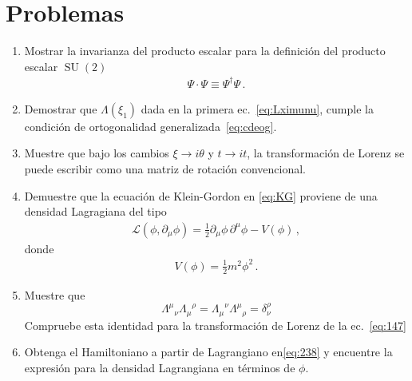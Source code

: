   
 



\section{Problemas}
\label{sec:problemas-2}
\renewcommand{\labelenumi}{\thechapter.\theenumi} %
\begin{enumerate}
\item  Mostrar la invarianza del producto escalar para la definición del producto escalar $\operatorname{SU}(2)$
\begin{align}
   \Psi\cdot \Psi \equiv \Psi^{\dagger}\Psi\,.
\end{align}

\item Demostrar que $\Lambda(\xi_1)$ dada en la primera ec.~\eqref{eq:Lximunu},  cumple la condición de ortogonalidad generalizada~\eqref{eq:cdeog}.

\item Muestre que bajo los cambios $\xi\to i\theta$ y $t\to it$, la transformación de Lorenz se puede escribir como una matriz de rotación convencional.

\item  Demuestre que la ecuación de Klein-Gordon en \eqref{eq:KG} proviene de una densidad Lagragiana del tipo
\begin{align}
  \mathcal{L}(\phi,\partial_{\mu} \phi)=  \frac{1}{2}{\partial_\mu\phi}\,{\partial^\mu\phi}-V(\phi)\,,
\end{align}
donde
\begin{align}
  V(\phi)=\frac{1}{2}m^2 \phi^2\,.
\end{align}

  
  
\item Muestre que
  \begin{equation*}
    {\Lambda^{\mu}}_{\nu}{\Lambda_\mu}^{\rho}={\Lambda_{\mu}}^{\nu}{\Lambda^{\mu}}_{\rho}=\delta^\rho_\nu
  \end{equation*}
Compruebe esta identidad para la transformación de Lorenz de la ec.~\eqref{eq:147}
\label{item:pch2.1} %

  
\item Obtenga el Hamiltoniano a partir de Lagrangiano en\eqref{eq:238} y encuentre la expresión para la densidad Lagrangiana en términos de $\phi$.
\label{item:pch1.0} %




\end{enumerate}
